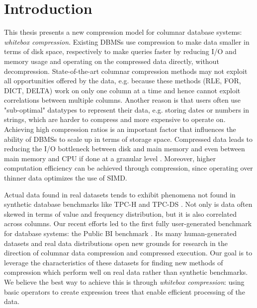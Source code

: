 
\chapter{Introduction}


\graphicspath{{1_introduction/images/}}

%



This thesis presents a new compression model for columnar database systems: \emph{whitebox compression}. Existing DBMSs use compression to make data smaller in terms of disk space, respectively to make queries faster by reducing I/O and memory usage and operating on the compressed data directly, without decompression. State-of-the-art columnar compression methods may not exploit all opportunities offered by the data, e.g. because these methods (RLE, FOR, DICT, DELTA) work on only one column at a time and hence cannot exploit correlations between multiple columns. Another reason is that users often use "sub-optimal" datatypes to represent their data, e.g. storing dates or numbers in strings, which are harder to compress and more expensive to operate on. Achieving high compression ratios is an important factor that influences the ability of DBMSs to scale up in terms of storage space. Compressed data leads to reducing the I/O bottleneck between disk and main memory and even between main memory and CPU if done at a granular level \cite{zukowski2006super}. Moreover, higher computation efficiency can be achieved through compression, since operating over thinner data optimizes the use of SIMD.

Actual data found in real datasets tends to exhibit phenomena not found in synthetic database benchmarks like TPC-H \cite{boncz2013tpc} and TPC-DS \cite{nambiar2006making}. Not only is data often skewed in terms of value and frequency distribution, but it is also correlated across columns. Our recent efforts led to the first fully user-generated benchmark for database systems: the Public BI benchmark \cite{pbib}. Its many human-generated datasets and real data distributions open new grounds for research in the direction of columnar data compression and compressed execution. Our goal is to leverage the characteristics of these datasets for finding new methods of compression which perform well on real data rather than synthetic benchmarks. We believe the best way to achieve this is through \emph{whitebox compression}: using basic operators to create expression trees that enable efficient processing of the data.

